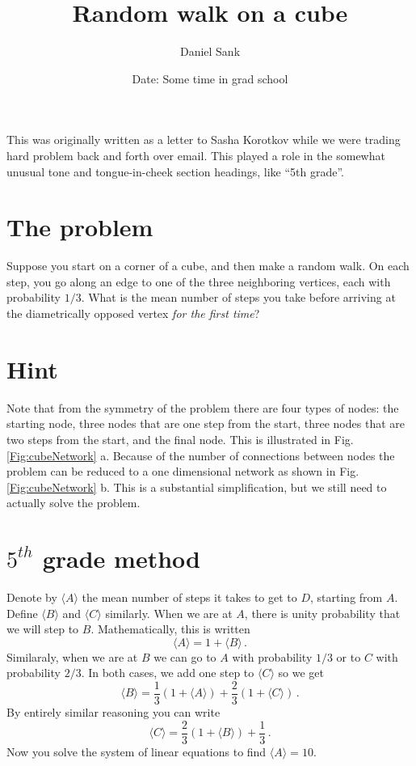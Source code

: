 \documentclass{article}
\begin{document}
\title{Random walk on a cube}
\author{Daniel Sank}
\date{Date: Some time in grad school}

\maketitle

This was originally written as a letter to Sasha Korotkov while we were trading hard problem back and forth over email.
This played a role in the somewhat unusual tone and tongue-in-cheek section headings, like ``5th grade''.

\section{The problem}

Suppose you start on a corner of a cube, and then make a random walk.
On each step, you go along an edge to one of the three neighboring vertices, each with probability $1/3$.
What is the mean number of steps you take before arriving at the diametrically opposed vertex \emph{for the first time}?

\section{Hint}

Note that from the symmetry of the problem there are four types of nodes: the starting node, three nodes that are one step from the start, three nodes that are two steps from the start, and the final node.
This is illustrated in Fig. \ref{Fig:cubeNetwork} a.
Because of the number of connections between nodes the problem can be reduced to a one dimensional network as shown in Fig. \ref{Fig:cubeNetwork} b.
This is a substantial simplification, but we still need to actually solve the problem.

\section{$5^{th}$ grade method}

Denote by $\langle A \rangle$ the mean number of steps it takes to get to $D$, starting from $A$. Define $\langle B \rangle$ and $\langle C \rangle$ similarly.
When we are at $A$, there is unity probability that we will step to $B$.
Mathematically, this is written
\begin{equation}
\langle A \rangle = 1 + \langle B \rangle \, .
\end{equation}
Similaraly, when we are at $B$ we can go to $A$ with probability $1/3$ or to $C$ with probability $2/3$.
In both cases, we add one step to $\langle C \rangle$ so we get
\begin{equation}
\langle B \rangle = \frac{1}{3}(1 + \langle A \rangle) + \frac{2}{3}(1 + \langle C \rangle) \, .
\end{equation}
By entirely similar reasoning you can write
\begin{equation}
\langle C \rangle = \frac{2}{3} (1 + \langle B \rangle) + \frac{1}{3} \, .
\end{equation}
Now you solve the system of linear equations to find $\langle A \rangle = 10$.
\end{document}
